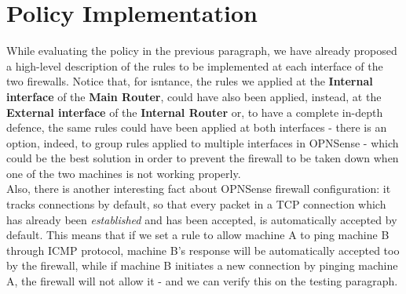 \section{Policy Implementation}
While evaluating the policy in the previous paragraph, we have already proposed a high-level description of the rules to be implemented at each interface of the two firewalls. Notice that, for isntance, the rules we applied at the \textbf{Internal interface} of the \textbf{Main Router}, could have also been applied, instead, at the \textbf{External interface} of the \textbf{Internal Router} or, to have a complete in-depth defence, the same rules could have been applied at both interfaces - there is an option, indeed, to group rules applied to multiple interfaces in OPNSense - which could be the best solution in order to prevent the firewall to be taken down when one of the two machines is not working properly.\\
Also, there is another interesting fact about OPNSense firewall configuration: it tracks connections by default, so that every packet in a TCP connection which has already been \textit{established} and has been accepted, is automatically accepted by default. This means that if we set a rule to allow machine A to ping machine B through ICMP protocol, machine B's response will be automatically accepted too by the firewall, while if machine B initiates a new connection by pinging machine A, the firewall will not allow it - and we can verify this on the testing paragraph.\\
